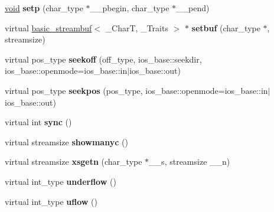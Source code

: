 \begin{DoxyCompactItemize}
\mbox{\label{classbasic__streambuf_a865c87fc1ec4a684275f69ceb783b319}} 
\hyperlink{interfacevoid}{void} {\bfseries setp} (char\+\_\+type $\ast$\+\_\+\+\_\+pbegin, char\+\_\+type $\ast$\+\_\+\+\_\+pend)
\item 
\mbox{\label{classbasic__streambuf_aee925cc203dba870200a64b8b217389c}} 
virtual \hyperlink{classbasic__streambuf}{basic\+\_\+streambuf}$<$ \+\_\+\+CharT, \+\_\+\+Traits $>$ $\ast$ {\bfseries setbuf} (char\+\_\+type $\ast$, streamsize)
\item 
\mbox{\label{classbasic__streambuf_a11e15e3ba5974b811c4c3d0bf8ea9c62}} 
virtual pos\+\_\+type {\bfseries seekoff} (off\+\_\+type, ios\+\_\+base\+::seekdir, ios\+\_\+base\+::openmode=ios\+\_\+base\+::in$\vert$ios\+\_\+base\+::out)
\item 
\mbox{\label{classbasic__streambuf_aa79c53d296946c759134b9ce4fd4d00a}} 
virtual pos\+\_\+type {\bfseries seekpos} (pos\+\_\+type, ios\+\_\+base\+::openmode=ios\+\_\+base\+::in$\vert$ios\+\_\+base\+::out)
\item 
\mbox{\label{classbasic__streambuf_acec4ccb6d665f880001aa70c70060246}} 
virtual int {\bfseries sync} ()
\item 
\mbox{\label{classbasic__streambuf_ac6535c3c41d0ac7d96a74011712f36d5}} 
virtual streamsize {\bfseries showmanyc} ()
\item 
\mbox{\label{classbasic__streambuf_a7403acdc30aa0678bf1f9d211b61f3df}} 
virtual streamsize {\bfseries xsgetn} (char\+\_\+type $\ast$\+\_\+\+\_\+s, streamsize \+\_\+\+\_\+n)
\item 
\mbox{\label{classbasic__streambuf_a62281ccd88bd9b8170f3fed591159ad8}} 
virtual int\+\_\+type {\bfseries underflow} ()
\item 
\mbox{\label{classbasic__streambuf_a3fedf5760885ac886babdcd61551dd8e}} 
virtual int\+\_\+type {\bfseries uflow} ()
\item 
\mbox{\label{classbasic__streambuf_aa52f47549971b3ff1a9911f1f483e3f1}} 

\end{DoxyCompactItemize}

